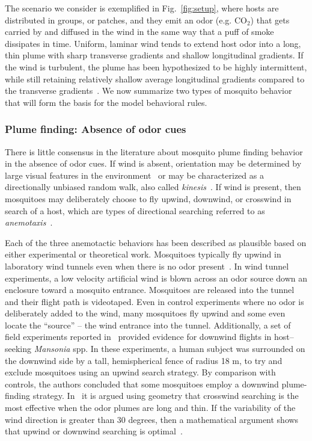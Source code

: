 \documentclass[10pt]{article}
\begin{document}
The scenario we consider is exemplified in Fig.~\ref{fig:setup}, where hosts are distributed in groups, or patches, and they emit an odor (e.g. CO$_2$) that gets carried by and diffused in the wind in the same way that a puff of smoke dissipates in time.  Uniform, laminar wind tends to extend host odor into a long, thin plume with sharp transverse gradients and shallow longitudinal gradients. If the wind is turbulent, the plume has been hypothesized to be highly intermittent, while still retaining relatively shallow average longitudinal gradients compared to the transverse
gradients~\cite{Vickers2000}.  
We now summarize two types of mosquito behavior that will form the basis for the model behavioral rules.
%
\subsubsection*{Plume finding: Absence of odor cues}
There is little consensus in the literature about mosquito plume finding behavior in the absence of odor cues. If wind is absent, orientation may be determined by large visual features in the
environment~\cite{Bidlingmayer1994} or may be characterized as a directionally unbiased random walk, also called \textit{kinesis}~\cite{OkumuModel2010}. If wind is present, then mosquitoes may deliberately choose to fly upwind, downwind, or crosswind in search of a host, which are types of directional searching referred to as \textit{anemotaxis}~\cite{Clements1999}.  

Each of the three anemotactic behaviors has been described as plausible based on either experimental or theoretical work.
Mosquitoes typically fly upwind in laboratory wind tunnels even when there is no odor present~\cite{Dekker2005,Gibson1999}. In wind tunnel experiments, a low velocity artificial wind is blown across an odor source down an enclosure toward a mosquito entrance. Mosquitoes are released into the tunnel and their flight path is videotaped. Even in control experiments where no odor is deliberately added to the wind, many mosquitoes fly upwind and some even locate the ``source'' -- the wind entrance into the tunnel.  
Additionally, a set of field experiments reported in~\cite{Gillies1974} provided evidence for downwind flights in host--seeking
 \textit{Mansonia} spp. In these experiments, a human subject was surrounded on the downwind side by a tall, hemispherical fence of radius 18 m, to try and exclude mosquitoes using an upwind search strategy. By comparison with controls, the authors concluded that some mosquitoes employ a downwind plume-finding strategy.  
In~\cite{Dusenbery1989} it is argued using geometry that crosswind searching is the most effective when the odor plumes are long and thin.  If the variability of the wind direction is greater than 30 degrees, then a mathematical argument shows that upwind or downwind searching is optimal~\cite{Sabelis1984}.  
\end{document}
